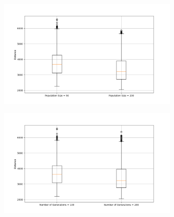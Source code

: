 \documentclass[11pt]{article}
\begin{document}
\begin{figure}[H]
    \centering
    \begin{subfigure}{0.48\textwidth}
        \includegraphics[width=\textwidth]{../results/population_size_boxplot.png}
        \label{fig:population_size}
    \end{subfigure}
    \begin{subfigure}{0.48\textwidth}
        \includegraphics[width=\textwidth]{../results/generations_boxplot.png}
        \label{fig:generations}
    \end{subfigure}
\end{figure}
\end{document}

